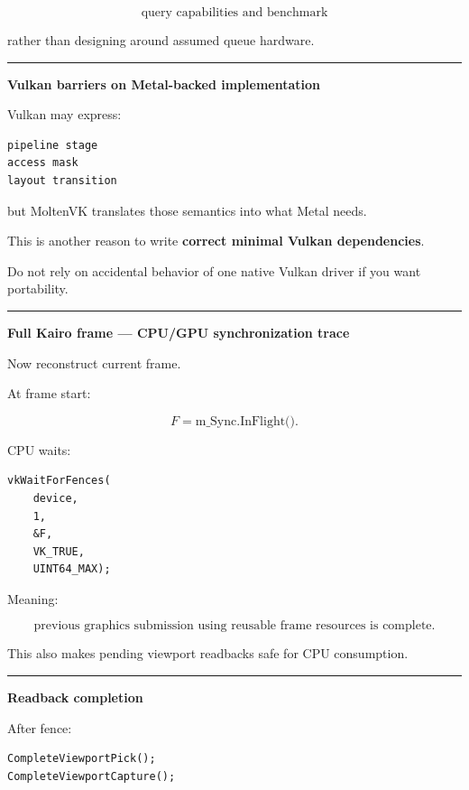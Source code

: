 \[
\boxed{
\text{query capabilities and benchmark}
}
\]

rather than designing around assumed queue hardware.

\begin{center}\rule{0.5\linewidth}{0.5pt}\end{center}

\textbf{Vulkan barriers on Metal-backed implementation}

Vulkan may express:

\begin{verbatim}
pipeline stage
access mask
layout transition
\end{verbatim}

but MoltenVK translates those semantics into what Metal needs.

This is another reason to write \textbf{correct minimal Vulkan dependencies}.

Do not rely on accidental behavior of one native Vulkan driver if you want portability.

\begin{center}\rule{0.5\linewidth}{0.5pt}\end{center}

\textbf{Full Kairo frame --- CPU/GPU synchronization trace}

Now reconstruct current frame.

At frame start:

\[
F=\text{m\_Sync.InFlight()}.
\]

CPU waits:

\begin{verbatim}
vkWaitForFences(
    device,
    1,
    &F,
    VK_TRUE,
    UINT64_MAX);
\end{verbatim}

Meaning:

\[
\boxed{
\text{previous graphics submission using reusable frame resources is complete}.
}
\]

This also makes pending viewport readbacks safe for CPU consumption.

\begin{center}\rule{0.5\linewidth}{0.5pt}\end{center}

\textbf{Readback completion}

After fence:

\begin{verbatim}
CompleteViewportPick();
CompleteViewportCapture();
\end{verbatim}


